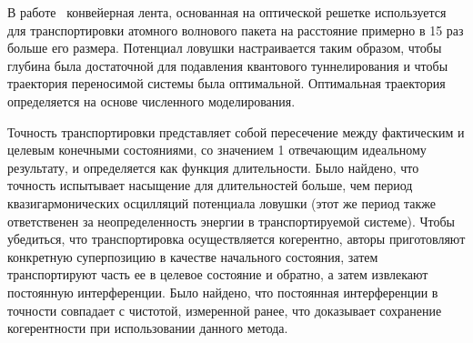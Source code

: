 \documentclass[a4paper, 14pt]{extarticle}
\begin{document}
В работе~\cite{two} конвейерная лента, основанная на оптической решетке 
используется для транспортировки атомного волнового пакета на расстояние 
примерно в 15 раз больше его размера. Потенциал ловушки настраивается 
таким образом, чтобы глубина была достаточной для подавления квантового 
туннелирования и чтобы траектория переносимой системы была оптимальной. 
Оптимальная траектория определяется на основе численного моделирования.



Точность транспортировки представляет собой пересечение между 
фактическим и целевым конечными состояниями, со значением 1 отвечающим 
идеальному результату, и определяется как функция длительности. Было 
найдено, что точность испытывает насыщение для длительностей больше, чем 
период квазигармонических осцилляций потенциала ловушки (этот же период 
также ответственен за неопределенность энергии в транспортируемой 
системе). Чтобы убедиться, что транспортировка осуществляется 
когерентно, авторы приготовляют конкретную суперпозицию в качестве 
начального состояния, затем транспортируют часть ее в целевое состояние 
и обратно, а затем извлекают постоянную интерференции. Было найдено, что 
постоянная интерференции в точности совпадает с чистотой, измеренной 
ранее, что доказывает сохранение когерентности при использовании данного 
метода.


\end{document}

